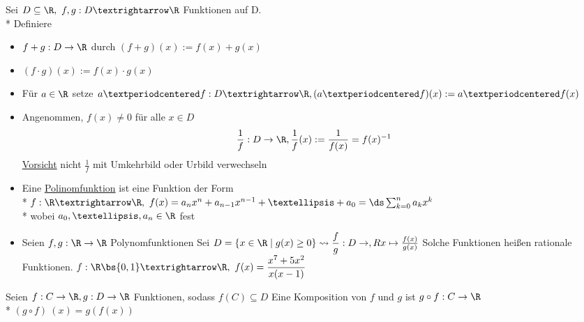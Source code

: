 Sei $D \subseteq \R , \ f,g: D→\R$ Funktionen auf D.\\*
Definiere
\begin{itemize}
\item{$f+g: D \to \R$ durch $(f + g)(x) := f(x) + g(x)$}
\item{$(f \cdot  g) (x) := f(x) \cdot g(x)$}
\item{Für $a\in\R$ setze $a·f: D→\R, (a·f)(x):=a·f(x)$}
\item{Angenommen, $f(x) \neq 0$ für alle $x \in D$
$$\frac{1}{f}: D \to \R, \frac{1}{f}(x) := \frac{1}{f(x)} = f(x)^{-1}$$
\ul{Vorsicht} nicht $\frac{1}{f}$ mit Umkehrbild oder Urbild verwechseln}
\end{itemize}

\begin{itemize}
\item{Eine \ul{Polinomfunktion} ist eine Funktion der Form\\*
$f: \R → \R,\ f(x) = a_n x^n+a_{n-1}x^{n-1}+…+a_0=\ds\sum_{k=0}^n a_k x^k $\\*
wobei $a_0,…,a_n \in \R$ fest}
\item{Seien $f, g : \R \to \R $ Polynomfunktionen
Sei $D = \{x \in \R \mid g(x) \geq 0\}\leadsto \dfrac{f}{g} : D \to , Rx \mapsto \frac{f(x)}{g(x)}$
Solche Funktionen heißen rationale Funktionen.
\bsp
$f:\R\bs\{0,1\}→\R, \ f(x)=\dfrac{x^7+5x^2}{x(x-1)}$}
\end{itemize}
Seien $f: C \to \R, g: D \to \R$ Funktionen, sodass $f(C) \subseteq D$
Eine Komposition von $ f $ und $ g $ ist 
%
$g \circ f : C \to \R$\\*
$(g \circ f) \ (x) = g(f(x))$